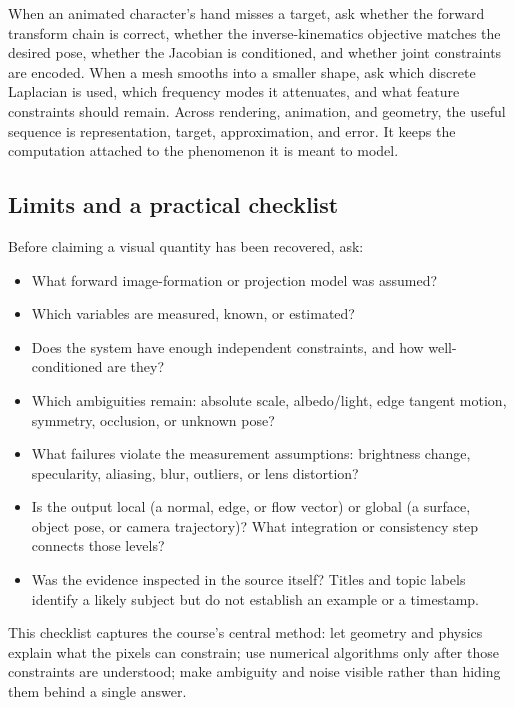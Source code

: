 When an animated character's hand misses a target, ask whether the forward transform chain is correct, whether the inverse-kinematics objective matches the desired pose, whether the Jacobian is conditioned, and whether joint constraints are encoded. When a mesh smooths into a smaller shape, ask which discrete Laplacian is used, which frequency modes it attenuates, and what feature constraints should remain. Across rendering, animation, and geometry, the useful sequence is representation, target, approximation, and error. It keeps the computation attached to the phenomenon it is meant to model.

\subsection{Limits and a practical checklist}\label{04-visual-computing-ii-ch034-limits-and-a-practical-checklist}

\hypertarget{04-visual-computing-ii-ch034-limits-and-a-practical-checklist}{}

Before claiming a visual quantity has been recovered, ask:

\begin{itemize}
\tightlist
\item
  What forward image-formation or projection model was assumed?
\item
  Which variables are measured, known, or estimated?
\item
  Does the system have enough independent constraints, and how well-conditioned are they?
\item
  Which ambiguities remain: absolute scale, albedo/light, edge tangent motion, symmetry, occlusion, or unknown pose?
\item
  What failures violate the measurement assumptions: brightness change, specularity, aliasing, blur, outliers, or lens distortion?
\item
  Is the output local (a normal, edge, or flow vector) or global (a surface, object pose, or camera trajectory)? What integration or consistency step connects those levels?
\item
  Was the evidence inspected in the source itself? Titles and topic labels identify a likely subject but do not establish an example or a timestamp.
\end{itemize}

This checklist captures the course's central method: let geometry and physics explain what the pixels can constrain; use numerical algorithms only after those constraints are understood; make ambiguity and noise visible rather than hiding them behind a single answer.

